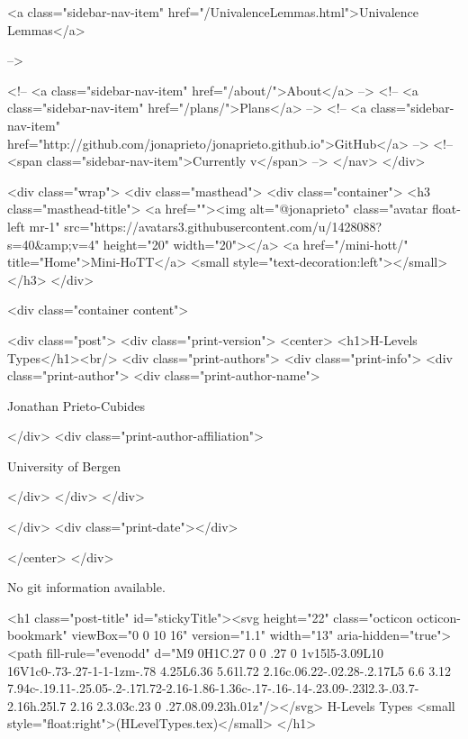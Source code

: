           <a class="sidebar-nav-item" href="/UnivalenceLemmas.html">Univalence Lemmas</a>
        
      
     -->

    <!-- <a class="sidebar-nav-item" href="/about/">About</a> -->
    <!-- <a class="sidebar-nav-item" href="/plans/">Plans</a> -->
    <!-- <a class="sidebar-nav-item" href="http://github.com/jonaprieto/jonaprieto.github.io">GitHub</a> -->
    <!-- <span class="sidebar-nav-item">Currently v</span> -->
  </nav>
</div>

    <div class="wrap">
      <div class="masthead">
        <div class="container">
          <h3 class="masthead-title">
            <a href=""><img alt="@jonaprieto" class="avatar float-left mr-1" src="https://avatars3.githubusercontent.com/u/1428088?s=40&amp;v=4" height="20" width="20"></a>
            <a href="/mini-hott/" title="Home">Mini-HoTT</a>
            <small style="text-decoration:left"></small>
          </h3>
        </div>
      
      <div class="container content">
        







<div class="post">
  <div class="print-version">
    <center>
      <h1>H-Levels Types</h1><br/>
        <div class="print-authors">
          <div class="print-info">
            <div class="print-author">
              <div class="print-author-name">
                
                  Jonathan Prieto-Cubides
                
              </div>
              <div class="print-author-affiliation">
                
                  University of Bergen
                
                </div>
            </div>
          </div>
          
          
        </div>
        <div class="print-date"></div>
        
        
    </center>
  </div>

  
  No git information available.
  

  <h1 class="post-title" id="stickyTitle"><svg height="22" class="octicon octicon-bookmark" viewBox="0 0 10 16" version="1.1" width="13" aria-hidden="true"><path fill-rule="evenodd" d="M9 0H1C.27 0 0 .27 0 1v15l5-3.09L10 16V1c0-.73-.27-1-1-1zm-.78 4.25L6.36 5.61l.72 2.16c.06.22-.02.28-.2.17L5 6.6 3.12 7.94c-.19.11-.25.05-.2-.17l.72-2.16-1.86-1.36c-.17-.16-.14-.23.09-.23l2.3-.03.7-2.16h.25l.7 2.16 2.3.03c.23 0 .27.08.09.23h.01z"/></svg> H-Levels Types <small style="float:right">(HLevelTypes.tex)</small>
  </h1>

